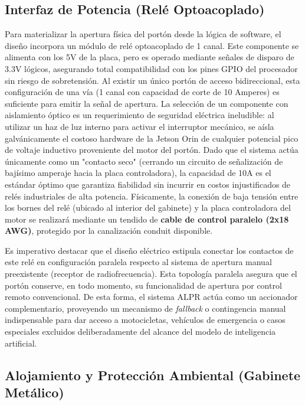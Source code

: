 \subsection{Interfaz de Potencia (Relé Optoacoplado)}

Para materializar la apertura física del portón desde la lógica de software, el diseño incorpora un módulo de relé optoacoplado de 1 canal. Este componente se alimenta con los 5V de la placa, pero es operado mediante señales de disparo de 3.3V lógicos, asegurando total compatibilidad con los pines GPIO del procesador sin riesgo de sobretensión. Al existir un único portón de acceso bidireccional, esta configuración de una vía (1 canal con capacidad de corte de 10 Amperes) es suficiente para emitir la señal de apertura. La selección de un componente con aislamiento óptico es un requerimiento de seguridad eléctrica ineludible: al utilizar un haz de luz interno para activar el interruptor mecánico, se aísla galvánicamente el costoso hardware de la Jetson Orin de cualquier potencial pico de voltaje inductivo proveniente del motor del portón. Dado que el sistema actúa únicamente como un "contacto seco" (cerrando un circuito de señalización de bajísimo amperaje hacia la placa controladora), la capacidad de 10A es el estándar óptimo que garantiza fiabilidad sin incurrir en costos injustificados de relés industriales de alta potencia. Físicamente, la conexión de baja tensión entre los bornes del relé (ubicado al interior del gabinete) y la placa controladora del motor se realizará mediante un tendido de \textbf{cable de control paralelo (2x18 AWG)}, protegido por la canalización conduit disponible.

Es imperativo destacar que el diseño eléctrico estipula conectar los contactos de este relé en configuración paralela respecto al sistema de apertura manual preexistente (receptor de radiofrecuencia). Esta topología paralela asegura que el portón conserve, en todo momento, su funcionalidad de apertura por control remoto convencional. De esta forma, el sistema ALPR actúa como un accionador complementario, proveyendo un mecanismo de \textit{fallback} o contingencia manual indispensable para dar acceso a motocicletas, vehículos de emergencia o casos especiales excluidos deliberadamente del alcance del modelo de inteligencia artificial.

\subsection{Alojamiento y Protección Ambiental (Gabinete Metálico)}

